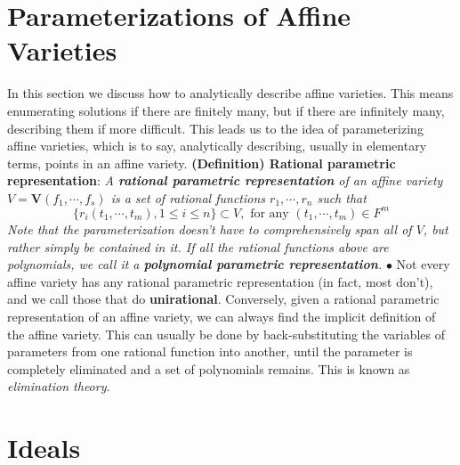 \documentclass{article}
\begin{document}
\section{Parameterizations of Affine Varieties}
In this section we discuss how to analytically describe affine varieties. This means enumerating solutions if there are finitely many, but if there are infinitely many, describing them if more difficult. This leads us to the idea of parameterizing affine varieties, which is to say, analytically describing, usually in elementary terms, points in an affine variety.
\newline \newline
\textbf{(Definition) Rational parametric representation}: \textit{A \textbf{rational parametric representation} of an affine variety $ V = \mathbf{V}(f_1, \cdots, f_s) $ is a set of rational functions $ r_1, \cdots, r_n $ such that}
$$ \{ r_i(t_1, \cdots, t_m), 1 \leq i \leq n \} \subset V, \text{ for any } (t_1, \cdots, t_m) \in F^m $$
\indent \textit{Note that the parameterization doesn't have to comprehensively span all of $ V $, but rather simply be contained in it. If all the rational functions above are polynomials, we call it a \textbf{polynomial parametric representation}.}
\newline
\indent $ \bullet $ Not every affine variety has any rational parametric representation (in fact, most don't), and we call those that do \textbf{unirational}. Conversely, given a rational parametric representation of an affine variety, we can always find the implicit definition of the affine variety. This can usually be done by back-substituting the variables of parameters from one rational function into another, until the parameter is completely eliminated and a set of polynomials remains. This is known as \textit{elimination theory}.

\section{Ideals}
\end{document}
